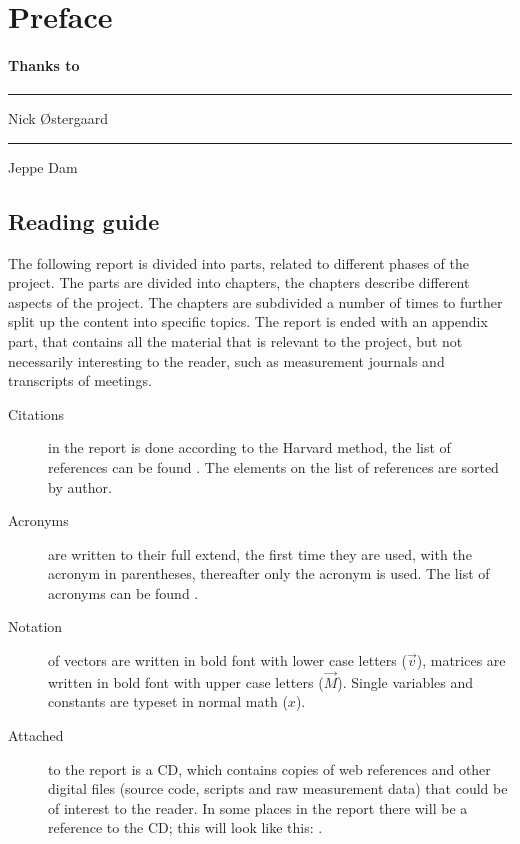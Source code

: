 \chapter{Preface}

\subsubsection*{Thanks to}


\begin{center}
  \begin{minipage}[t]{0.47\textwidth}
    \centering \vspace{1.5cm} \hrule \vspace{1mm} Nick \O stergaard
  \end{minipage}
  \hfill
  \begin{minipage}[t]{0.47\textwidth}
    \centering \vspace{1.5cm} \hrule \vspace{1mm} Jeppe Dam
  \end{minipage}
\end{center}


\newpage
\section{Reading guide}
The following report is divided into parts, related to different phases of the project. The parts are divided into chapters, the chapters describe different aspects of the project. The chapters are subdivided a number of times to further split up the content into specific topics. The report is ended with an appendix part, that contains all the material that is relevant to the project, but not necessarily interesting to the reader, such as measurement journals and transcripts of meetings.

\begin{description}
\item[Citations] in the report is done according to the Harvard method, the list of references can be found . The elements on the list of references are sorted by author.
\item[Acronyms] are written to their full extend, the first time they are used, with the acronym in parentheses, thereafter only the acronym is used. The list of acronyms can be found .
\item[Notation] of vectors are written in bold font with lower case letters ($\vec{v}$), matrices are written in bold font with upper case letters ($\vec{M}$). Single variables and constants are typeset in normal math ($x$).
\item[Attached] to the report is a CD, which contains copies of web references and other digital files (source code, scripts and raw measurement data) that could be of interest to the reader. In some places in the report there will be a reference to the CD; this will look like this: .
\end{description}
